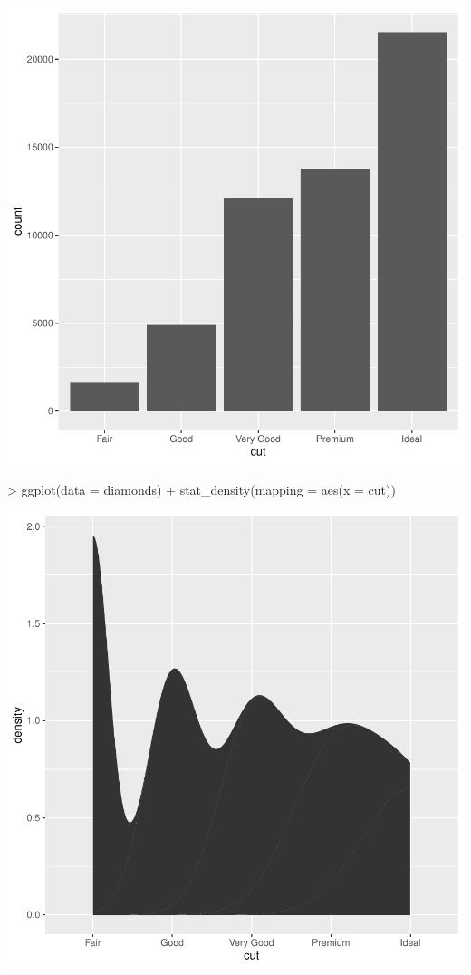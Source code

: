 \documentclass{article}
\begin{document}
\includegraphics{tidigg-003}
\begin{Schunk}
\begin{Sinput}
> ggplot(data = diamonds) + stat_density(mapping = aes(x = cut))
\end{Sinput}
\end{Schunk}
\includegraphics{tidigg-004}
\end{document}
